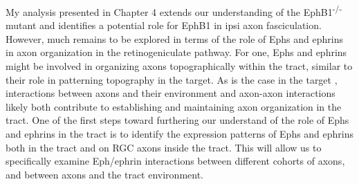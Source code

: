 My analysis presented in Chapter 4 extends our understanding of the EphB1\textsuperscript{-/-} mutant and identifies a potential role for EphB1 in ipsi axon fasciculation.
However, much remains to be explored in terms of the role of Ephs and ephrins in axon organization in the retinogeniculate pathway.
For one, Ephs and ephrins might be involved in organizing axons topographically within the tract, similar to their role in patterning topography in the target.
As is the case in the target \cite{weth2014chemoaffinity}, interactions between axons and their environment and axon-axon interactions likely both contribute to establishing and maintaining axon organization in the tract.
One of the first steps toward furthering our understand of the role of Ephs and ephrins in the tract is to identify the expression patterns of Ephs and ephrins both in the tract and on RGC axons inside the tract.
This will allow us to specifically examine Eph/ephrin interactions between different cohorts of axons, and between axons and the tract environment.